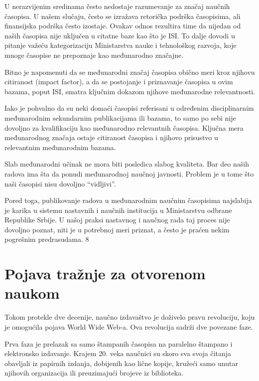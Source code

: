 \documentclass[12pt,a4paper]{article}
\begin{document}
     U nerazvijenim sredinama često nedostaje razumevanje za značaj naučnih časopisa. U našem slučaju, često se izražava retorička podrška časopisima, ali finansijska podrška često izostaje. Ovakav odnos rezultira time da nijedan od naših časopisa nije uključen u citatne baze kao što je ISI. To dalje dovodi u pitanje važeću kategorizaciju Ministarstva nauke i tehnološkog razvoja, koje mnoge časopise ne prepoznaje kao međunarodno značajne.

    Bitno je napomenuti da se međunarodni značaj časopisa obično meri kroz njihovu citiranost (impact factor), a da se postojanje i priznavanje časopisa u ovim bazama, poput ISI, smatra ključnim dokazom njihove međunarodne relevantnosti.\cite{2}

    Iako je pohvalno da su neki domaći časopisi referisani u određenim disciplinarnim međunarodnim sekundarnim publikacijama ili bazama, to samo po sebi nije dovoljno za kvalifikaciju kao međunarodno relevantnih časopisa. Ključna mera međunarodnog značaja ostaje citiranost časopisa i njihovo prisustvo u relevantnim međunarodnim bazama. 
     
     Slab međunarodni učinak ne mora biti posledica slabog kvaliteta. Bar deo naših radova ima šta da ponudi međunarodnoj naučnoj javnosti. Problem je u tome što naši časopisi nisu dovoljno “vidljivi”.
     
     Pored toga, publikovanje radova u međunarodnim naučnim časopisima najslabija je karika u sistemu nastavnih i naučnih institucija u Ministarstvu odbrane Republike Srbije. U našoj praksi nastavnog i naučnog rada taj proces nije dovoljno poznat, niti je u potrebnoj meri priznat, a često je praćen nekim pogrešnim predrasudama. \cite{7}{8}
     

\section{\large\textbf{Pojava tražnje za otvorenom naukom}}
\indent 

Tokom protekle dve decenije, naučno izdavaštvo je doživelo pravu revoluciju, koju je omogućila pojava World Wide Web-a. Ova revolucija sadrži dve povezane faze.

   Prva faza je prelazak sa samo štampanih časopisa na paralelno štampano i elektronsko izdavanje. Krajem 20. veka naučnici su skoro sva svoja čitanja obavljali iz papirnih izdanja, dobijenih kao lične kopije, kružeći samo unutar njihovih organizacija ili preuzimajući brojeve iz biblioteka.
   
\end{document}

